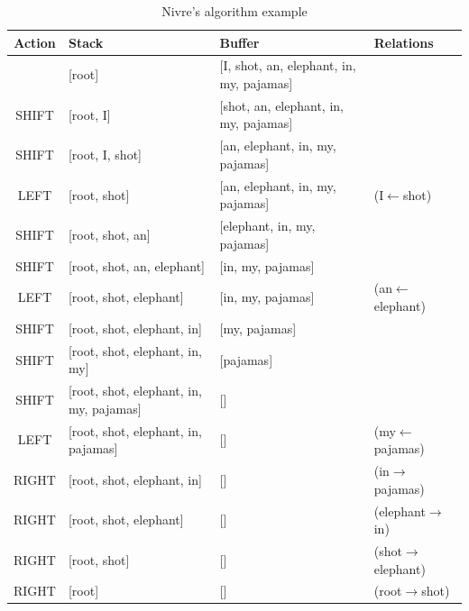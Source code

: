\documentclass[12pt]{article}
\begin{document}
\begin{table}[H]
	\centering
	\begin{tabular}{c | p{4cm} | p{4cm} | p{2.8cm}}
		\textbf{Action} & \textbf{Stack} & \textbf{Buffer} & \textbf{Relations} \\
		\hline
		& [root] & [I, shot, an, elephant, in, my, pajamas] & \\
		\cline{1-3}
		SHIFT & [root, I] & [shot, an, elephant, in, my, pajamas] &\\
		\cline{1-3}
		SHIFT & [root, I, shot] & [an, elephant, in, my, pajamas] &\\
		\cline{1-3}
		LEFT & [root, shot] & [an, elephant, in, my, pajamas] & (I$\leftarrow$shot)\\
		\cline{1-3}
		SHIFT & [root, shot, an] & [elephant, in, my, pajamas] &\\
		\cline{1-3}
		SHIFT & [root, shot, an, elephant] & [in, my, pajamas] &\\
		\cline{1-3}
		LEFT & [root, shot, elephant] & [in, my, pajamas] & (an$\leftarrow$elephant)\\
		\cline{1-3}
		SHIFT & [root, shot, elephant, in] & [my, pajamas] &\\
		\cline{1-3}
		SHIFT & [root, shot, elephant, in, my] & [pajamas] &\\
		\cline{1-3}
		SHIFT & [root, shot, elephant, in, my, pajamas] & [] &\\
		\cline{1-3}
		LEFT & [root, shot, elephant, in, pajamas] & [] & (my$\leftarrow$pajamas)\\
		\cline{1-3}
		RIGHT & [root, shot, elephant, in] & [] & (in$\rightarrow$pajamas)\\
		\cline{1-3}
		RIGHT & [root, shot, elephant] & [] & (elephant$\rightarrow$in)\\
		\cline{1-3}
		RIGHT & [root, shot] & [] & (shot$\rightarrow$elephant)\\
		\cline{1-3}
		RIGHT & [root] & [] & (root$\rightarrow$shot)\\
		\hline
	\end{tabular}
	\caption{Nivre's algorithm example}
	\label{tb:nivre_example}
\end{table}
\end{document}
